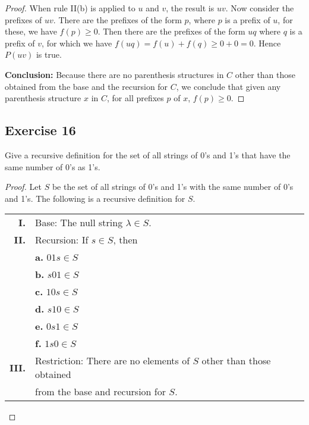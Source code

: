 \documentclass[14pt]{extarticle}
\begin{document}
\begin{proof}
    When rule II(b) is applied to $u$ and $v$, the result is $uv$. Now consider the prefixes of $uv$. There are the
    prefixes of the form $p$, where $p$ is a prefix of $u$, for these, we have \(f(p) \geq 0\). Then there are the prefixes
    of the form $uq$ where $q$ is a prefix of $v$, for which we have \(f(uq) = f(u) + f(q) \geq 0 + 0 = 0\).
    Hence $P(uv)$ is true.

        {\bf Conclusion:} Because there are no parenthesis structures in $C$ other than those obtained from the base
    and the recursion for $C$, we conclude that given any parenthesis structure $x$ in $C$, for all prefixes $p$ of $x$, \(f(p) \geq 0\).
\end{proof}

\subsection{Exercise 16}
Give a recursive definition for the set of all strings of 0’s and 1’s that have the same number of 0’s as 1’s.

\begin{proof}
    Let $S$ be the set of all strings of 0’s and 1’s with the
    same number of 0’s and 1’s.
    The following is a recursive definition for $S$.

    \begin{tabular}{rl}
        {\bf I.}   & Base: The null string $\lambda \in S$.                              \\
        {\bf II.}  & Recursion: If $s \in S$, then                                       \\
                   & {\bf a.} $01s \in S$                                                \\
                   & {\bf b.} $s01 \in S$                                                \\
                   & {\bf c.} $10s \in S$                                                \\
                   & {\bf d.} $s10 \in S$                                                \\
                   & {\bf e.} $0s1 \in S$                                                \\
                   & {\bf f.} $1s0 \in S$                                                \\
        {\bf III.} & Restriction: There are no elements of $S$ other than those obtained \\
                   & from the base and recursion for $S$.
    \end{tabular}
\end{proof}
\end{document}
